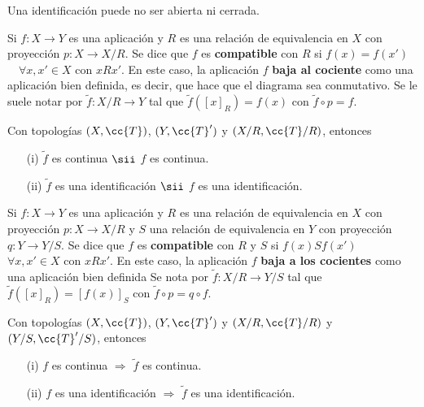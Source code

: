 \begin{observacion}
    Una identificación puede no ser abierta ni cerrada.
    \endsquare
\end{observacion}


\begin{definicion}
    Si $f:X \to Y$ es una aplicación y $R$ es una relación de equivalencia en $X$ con proyección $p:X \to X/R$.
    Se dice que $f$ es \textbf{compatible} con $R$ si $f(x)=f(x')$\ \ $\forall x, x' \in X$ con $xRx'$. En este caso, la aplicación $f$ \textbf{baja al cociente} como una aplicación bien definida, es decir, que hace que el diagrama sea conmutativo. Se le suele notar por $\tilde{f}:X/R \to Y$ tal que $\tilde{f}([x]_R)=f(x)$ con $\tilde{f}\circ p = f$.
    \endsquare
\end{definicion}

\begin{coro}
    Con topologías $(X, \cc{T})$, $(Y, \cc{T}')$ y $(X/R, \cc{T}/R)$, entonces 
    \begin{enumerate}
        \item[(i)] $\tilde{f}$ es continua $\sii$ $f$ es continua.
        \item[(ii)] $\tilde{f}$ es una identificación $\sii$ $f$ es una identificación.
    \end{enumerate}
    \endsquare
\end{coro}

\begin{definicion}
    Si $f:X \to Y$ es una aplicación y $R$ es una relación de equivalencia en $X$ con proyección $p:X \to X/R$ y $S$ una relación de equivalencia en $Y$ con proyección $q:Y \to Y/S$.
    Se dice que $f$ es \textbf{compatible} con $R$ y $S$ si $f(x)Sf(x')$\ \ $\forall x, x' \in X$ con $xRx'$. En este caso, la aplicación $f$ \textbf{baja a los cocientes} como una aplicación bien definida Se nota por $\tilde{f}:X/R \to Y/S$ tal que $\tilde{f}([x]_R)=[f(x)]_S$ con $\tilde{f}\circ p = q \circ f$.
    \endsquare
\end{definicion}

\begin{coro}
    Con topologías $(X, \cc{T})$, $(Y, \cc{T}')$ y $(X/R, \cc{T}/R)$ y $(Y/S, \cc{T}'/S)$, entonces 
    \begin{enumerate}
        \item[(i)] $f$ es continua $\Rightarrow$ $\tilde{f}$ es continua.
        \item[(ii)] $f$ es una identificación $\Rightarrow$ $\tilde{f}$ es una identificación.
    \end{enumerate}
    \endsquare
\end{coro}

